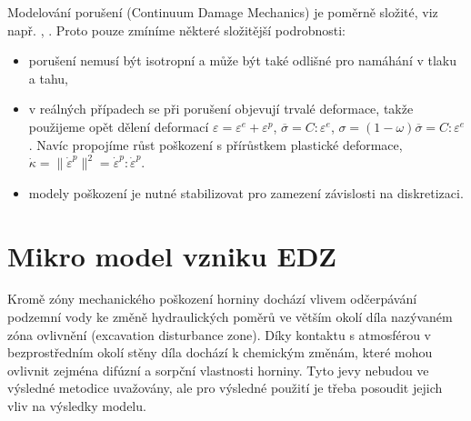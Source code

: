 \documentclass{article}
\begin{document}
Modelování porušení (Continuum Damage Mechanics) je poměrně složité, viz např. \cite{Lemaitre1992}, \cite{Neto2011}. Proto pouze zmíníme některé složitější podrobnosti:
\begin{itemize}
	\item porušení nemusí být isotropní a může být také odlišné pro namáhání v tlaku a tahu,
	\item v reálných případech se při porušení objevují trvalé deformace, takže
	použijeme opět dělení deformací $\varepsilon=\varepsilon^e + \varepsilon^p$, $\overline{\sigma} = C : \varepsilon^e$, $\sigma = (1-\omega)\overline{\sigma} = C : \varepsilon^e$. Navíc propojíme růst poškození s přírůstkem plastické deformace, $\dot{\kappa} = \|\dot{\varepsilon}^p\|^2 = \dot{\varepsilon}^p : \dot{\varepsilon}^p$.
	\item modely poškození je nutné stabilizovat pro zamezení závislosti na diskretizaci.
\end{itemize}

















\section{Mikro model vzniku EDZ}
\label{sec:micro_EDZ}
Kromě zóny mechanického poškození horniny dochází vlivem odčerpávání podzemní vody ke změně hydraulických poměrů ve větším okolí díla nazývaném zóna ovlivnění (excavation disturbance zone). Díky kontaktu s atmosférou v bezprostředním okolí stěny díla dochází k chemickým změnám, které mohou ovlivnit zejména difúzní a sorpční vlastnosti horniny. Tyto jevy nebudou ve výsledné metodice uvažovány, ale pro výsledné použití je třeba posoudit jejich vliv na výsledky modelu.
\end{document}
